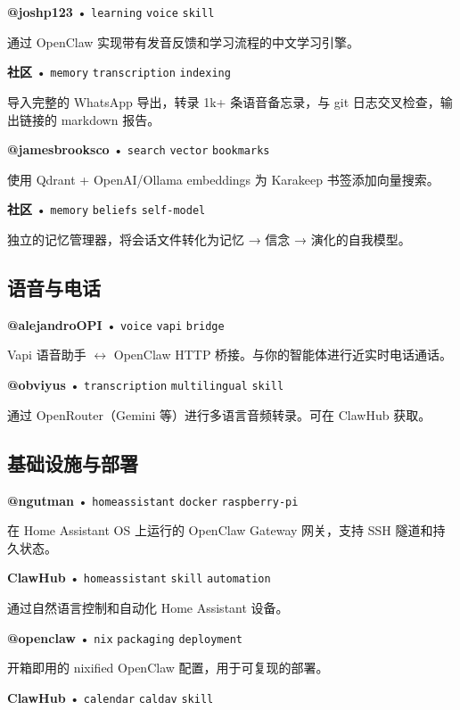 \textbf{@joshp123} • \texttt{learning} \texttt{voice} \texttt{skill}

通过 OpenClaw 实现带有发音反馈和学习流程的中文学习引擎。


\textbf{社区} • \texttt{memory} \texttt{transcription} \texttt{indexing}

导入完整的 WhatsApp 导出，转录 1k+ 条语音备忘录，与 git 日志交叉检查，输出链接的 markdown 报告。

\textbf{@jamesbrooksco} • \texttt{search} \texttt{vector} \texttt{bookmarks}

使用 Qdrant + OpenAI/Ollama embeddings 为 Karakeep 书签添加向量搜索。

\textbf{社区} • \texttt{memory} \texttt{beliefs} \texttt{self-model}

独立的记忆管理器，将会话文件转化为记忆 → 信念 → 演化的自我模型。


\subsection{语音与电话}



\textbf{@alejandroOPI} • \texttt{voice} \texttt{vapi} \texttt{bridge}

Vapi 语音助手 $\leftrightarrow$ OpenClaw HTTP 桥接。与你的智能体进行近实时电话通话。

\textbf{@obviyus} • \texttt{transcription} \texttt{multilingual} \texttt{skill}

通过 OpenRouter（Gemini 等）进行多语言音频转录。可在 ClawHub 获取。


\subsection{基础设施与部署}



\textbf{@ngutman} • \texttt{homeassistant} \texttt{docker} \texttt{raspberry-pi}

在 Home Assistant OS 上运行的 OpenClaw Gateway 网关，支持 SSH 隧道和持久状态。

\textbf{ClawHub} • \texttt{homeassistant} \texttt{skill} \texttt{automation}

通过自然语言控制和自动化 Home Assistant 设备。

\textbf{@openclaw} • \texttt{nix} \texttt{packaging} \texttt{deployment}

开箱即用的 nixified OpenClaw 配置，用于可复现的部署。

\textbf{ClawHub} • \texttt{calendar} \texttt{caldav} \texttt{skill}

